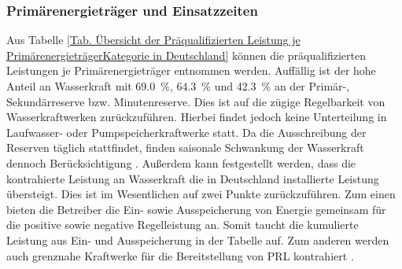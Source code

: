 			\renewcommand*{\arraystretch}{1.5}
		
		\subsubsection{Primärenergieträger und Einsatzzeiten}
			
			Aus Tabelle \ref{Tab. Übersicht der Präqualifizierten Leistung je PrimärenergieträgerKategorie in Deutschland} können die präqualifizierten Leistungen je Primärenergieträger entnommen werden.
			Auffällig ist der hohe Anteil an Wasserkraft mit \SI{69,0}{\percent}, \SI{64,3}{\percent} und \SI{42,3}{\percent} an der Primär-, Sekundärreserve bzw. Minutenreserve.
			Dies ist auf die zügige Regelbarkeit von Wasserkraftwerken zurückzuführen.
			Hierbei findet jedoch keine Unterteilung in Laufwasser- oder Pumpspeicherkraftwerke statt.
			Da die Ausschreibung der Reserven täglich stattfindet, finden saisonale Schwankung der Wasserkraft dennoch Berücksichtigung \cite[S. 80]{Doktorarbeit_Reitsam}. 
			Außerdem kann festgestellt werden, dass die kontrahierte Leistung an Wasserkraft die in Deutschland installierte Leistung übersteigt.
			Dies ist im Wesentlichen auf zwei Punkte zurückzuführen.
			Zum einen bieten die Betreiber die Ein- sowie Ausspeicherung von Energie gemeinsam für die positive sowie negative Regelleistung an.
			Somit taucht die kumulierte Leistung aus Ein- und Ausspeicherung in der Tabelle auf.
			Zum anderen werden auch grenznahe Kraftwerke für die Bereitstellung von PRL kontrahiert \cite[S. 144]{Bericht_Wasserkraft}. \\
			
